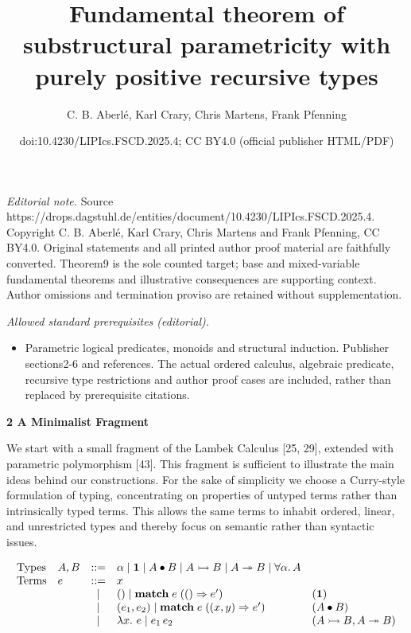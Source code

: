 \documentclass[10pt,a4paper]{amsart}
\title{Fundamental theorem of substructural parametricity with purely positive recursive types}
\author{C. B. Aberlé, Karl Crary, Chris Martens, Frank Pfenning}
\date{doi:10.4230/LIPIcs.FSCD.2025.4; CC BY4.0 (official publisher HTML/PDF)}
\begin{document}
\maketitle
\noindent\textit{Editorial note.} Source https://drops.dagstuhl.de/entities/document/10.4230/LIPIcs.FSCD.2025.4. Copyright C. B. Aberlé, Karl Crary, Chris Martens and Frank Pfenning, CC BY4.0. Original statements and all printed author proof material are faithfully converted. Theorem9 is the sole counted target; base and mixed-variable fundamental theorems and illustrative consequences are supporting context. Author omissions and termination proviso are retained without supplementation.\par\medskip
\noindent\textit{Allowed standard prerequisites (editorial).}\begin{itemize}
\item Parametric logical predicates, monoids and structural induction. Publisher sections2-6 and references. The actual ordered calculus, algebraic predicate, recursive type restrictions and author proof cases are included, rather than replaced by prerequisite citations.
\end{itemize}\medskip
 
\par\medskip\noindent\textbf{2 A Minimalist Fragment}\par
 
 
We start with a small fragment of the Lambek Calculus [25, 29], extended with parametric polymorphism [43]. This fragment is sufficient to illustrate the main ideas behind our constructions. For the sake of simplicity we choose a Curry-style formulation of typing, concentrating on properties of untyped terms rather than intrinsically typed terms. This allows the same terms to inhabit ordered, linear, and unrestricted types and thereby focus on semantic rather than syntactic issues.\par
  
\par  \quad  \[\begin{array}[]{llcll}\mbox{Types}&A,B&::=&\alpha\mid\mathbf{1}\mid A\bullet B\mid A\rightarrowtail B\mid A\twoheadrightarrow B\mid\forall\alpha.\,A\\
\mbox{Terms}&e&::=&x\\
&&\mid&()\mid\mathbf{match}\;e\;(()\Rightarrow e^{\prime})&(\mathbf{1})\\
&&\mid&(e_{1},e_{2})\mid\mathbf{match}\;e\;((x,y)\Rightarrow e^{\prime})&(A\bullet B)\\
&&\mid&\lambda x.\ e\mid e_{1}\,e_{2}&(A\rightarrowtail B,A\twoheadrightarrow B)\end{array}\]\quad  \quad  
  
\end{document}

